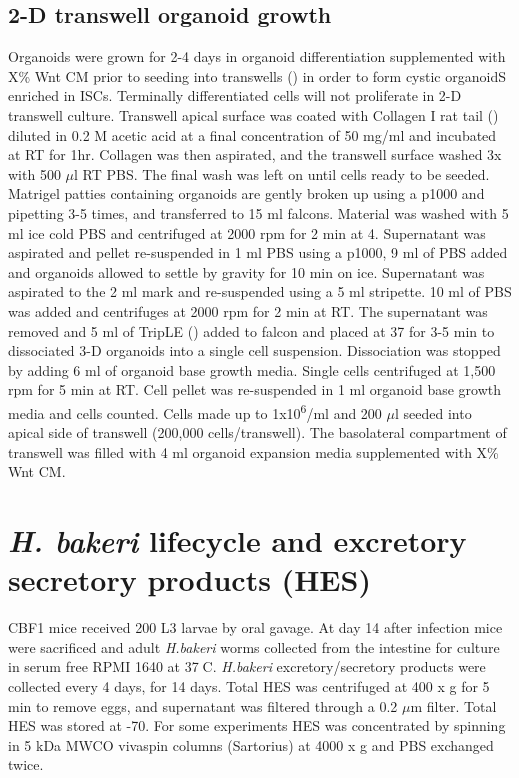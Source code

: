 \documentclass[a4paper]{report}
\begin{document}
\subsection{2-D transwell organoid growth}
Organoids were grown for 2-4 days in organoid differentiation supplemented with X\% Wnt CM prior to seeding into transwells  () in order to form cystic organoidS enriched in ISCs. Terminally differentiated cells will not proliferate in 2-D transwell culture. 
\vspace{2mm}\newline Transwell apical surface was coated with Collagen I rat tail () diluted in 0.2 M acetic acid at a final concentration of 50 mg/ml and incubated at RT for 1hr. Collagen was then aspirated, and the transwell surface washed 3x with 500 $\mu$l RT PBS. The final wash was left on until cells ready to be seeded.
\vspace{2mm}\newline Matrigel patties containing organoids are gently broken up using a p1000 and pipetting 3-5 times, and transferred to 15 ml falcons. Material was washed with 5 ml ice cold PBS and centrifuged at 2000 rpm for 2 min at 4. Supernatant was aspirated and pellet re-suspended in 1 ml PBS using a p1000, 9 ml of PBS added and organoids allowed to settle by gravity for 10 min on ice. Supernatant was aspirated to the 2 ml mark and re-suspended using a 5 ml stripette. 10 ml of PBS was added and centrifuges at 2000 rpm for 2 min at RT. The supernatant was removed and 5 ml of TripLE () added to falcon and placed at 37 for 3-5 min to dissociated 3-D organoids into a single cell suspension. Dissociation was stopped by adding 6 ml of organoid base growth media. Single cells centrifuged at 1,500 rpm for 5 min at RT. Cell pellet was re-suspended in 1 ml organoid base growth media and cells counted. Cells made up to 1x10\textsuperscript{6}/ml and 200 $\mu$l seeded into apical side of transwell (200,000 cells/transwell). The basolateral compartment of transwell was filled with 4 ml organoid expansion media supplemented with X\% Wnt CM. 
\section {\textit{H. bakeri} lifecycle and excretory secretory products (HES)}
\justifying
CBF1 mice received 200 L3 larvae by oral gavage. At day 14 after infection mice were sacrificed and adult \textit{H.bakeri} worms collected from the intestine for culture in serum free RPMI 1640 at 37C. \textit{H.bakeri} excretory/secretory products were collected every 4 days, for 14 days. Total HES was centrifuged at 400 x g for 5 min to remove eggs, and supernatant was filtered through a 0.2 $\mu$m filter. Total HES was stored at -70. For some experiments HES was concentrated by spinning in 5 kDa MWCO vivaspin columns (Sartorius) at 4000 x g and PBS exchanged twice.
\end{document}
